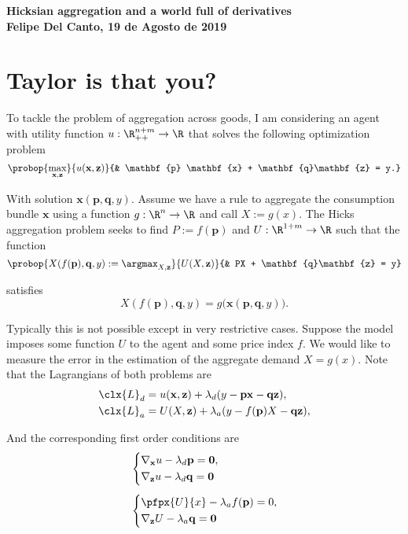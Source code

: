 \documentclass[english, a4paper,12pt]{article}
\begin{document}
\begin{center} \bf \large
	Hicksian aggregation and a world full of derivatives \\ Felipe Del Canto, 19 de Agosto de 2019
\end{center}

\section{Taylor is that you?}
To tackle the problem of aggregation across goods, I am considering an agent with utility function $u : \R^{n+m}_{++} \to \R$ that solves the following optimization problem
	$$\probop{\max_{\mathbf{x}, \mathbf{z}}}{u(\mathbf{x}, \mathbf{z})}
							{&	\mathbf{p} \mathbf{x} + \mathbf{q}\mathbf{z} = y.}$$ 

With solution $\mathbf{x}(\mathbf{p}, \mathbf{q}, y)$. Assume we have a rule to aggregate the consumption bundle $\mathbf{x}$ using a function $g: \R^{n} \to \R$ and call $X := g(x)$. The Hicks aggregation problem seeks to find $P := f(\mathbf{p})$ and $U: \R^{1+m} \to \R$ such that the function
	$$\probop{X(f(\mathbf{p}), \mathbf{q}, y) := \argmax_{X, \mathbf{z}}}{U(X,\mathbf{z})}
										{&	PX + \mathbf{q}\mathbf{z} = y}$$ 

satisfies
	$$X(f(\mathbf{p}), \mathbf{q}, y) = g\big(\mathbf{x}(\mathbf{p}, \mathbf{q}, y)\big).$$
 
Typically this is not possible except in very restrictive cases. Suppose the model imposes some function $U$ to the agent and some price index $f$. We would like to measure the error in the estimation of the aggregate demand $X = g(x)$. Note that the Lagrangians of both problems are
	\begin{align}
		\clx{L}_{d}
			&=	u(\mathbf{x}, \mathbf{z}) + \lambda_{d}(y - \mathbf{p}\mathbf{x} - \mathbf{q}\mathbf{z}),	\label{eq:Ld}	\\
		\clx{L}_{a}
			&=	U(X, \mathbf{z}) + \lambda_{a}(y - f(\mathbf{p})X - \mathbf{q}\mathbf{z}),	\label{eq:La}
	\end{align}
 
And the corresponding first order conditions are
	\begin{align}
		&\left\{ \begin{aligned}
			&\nabla_{\mathbf{x}}u - \lambda_{d}\mathbf{p} = \mathbf{0},	\\
			&\nabla_{\mathbf{z}}u - \lambda_{d}\mathbf{q} = \mathbf{0}
		\end{aligned}\right.	\label{eq:CPOd}	\\[1ex]
		&\left\{ \begin{aligned}
			&\pfpx{U}{x} - \lambda_{a}f(\mathbf{p}) = 0,	\\
			&\nabla_{\mathbf{z}}U - \lambda_{a}\mathbf{q} = \mathbf{0}
		\end{aligned}\right.	\label{eq:CPOa}
	\end{align}
\end{document}
